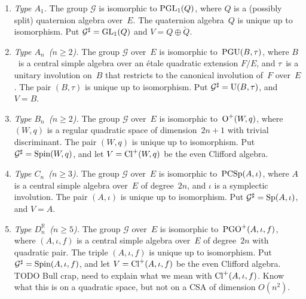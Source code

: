 \documentclass[10pt,twoside,leqno]{article}
\numberwithin{equation}{subsection}
\newcommand{\dual}[1]{\check{#1}}
\newcommand{\RR}{\mathbb{R}}
\newcommand{\GL}{\textnormal{GL}}
\newcommand{\PGL}{\textnormal{PGL}}
\newcommand{\UU}{\textnormal{U}}
\newcommand{\PGU}{\textnormal{PGU}}
\newcommand{\OO}{\textnormal{O}}
\newcommand{\PGO}{\textnormal{PGO}}
\newcommand{\Spin}{\textnormal{Spin}}
\newcommand{\Sp}{\textnormal{Sp}}
\newcommand{\PCSp}{\textnormal{PCSp}}
\newcommand{\Cliff}{\textnormal{Cl}}
\begin{document}
\begin{enumerate}[label=\thesubsection.\arabic*,align=left,%
  itemsep=\baselineskip,topsep=\baselineskip,%
  leftmargin=0pt,labelindent=0pt,labelsep=1ex,labelwidth=6ex,itemindent=!]
 \item \emph{Type \(A_{1}\).}
  The group \(\mathcal{G}\) is isomorphic to \(\PGL_{1}(Q)\),
  where \(Q\) is a (possibly split) quaternion algebra over~\(E\).
  The quaternion algebra~\(Q\) is unique up to isomorphism.
  Put \(\mathcal{G}^{\sharp} = \GL_{1}(Q)\) and \(V = Q \oplus \dual{Q}\).

 \item \emph{Type \(A_{n}\)~(\(n \ge 2\)).}
  The group \(\mathcal{G}\) over~\(E\) is isomorphic to~\(\PGU(B,\tau)\),
  where \(B\)~is a central simple algebra over
  an \'{e}tale quadratic extension \(F/E\),
  and \(\tau\)~is a unitary involution on~\(B\)
  that restricts to the canonical involution of~\(F\) over~\(E\).
  The pair \((B,\tau)\) is unique up to isomorphism.
  Put \(\mathcal{G}^{\sharp} = \UU(B,\tau)\), and \(V = B\).

 \item \emph{Type \(B_{n}\)~(\(n \ge 2\)).}
  The group \(\mathcal{G}\) over~\(E\) is isomorphic to~\(\OO^{+}(W,q)\),
  where \((W,q)\) is a regular quadratic space of dimension~\(2n+1\)
  with trivial discriminant.
  The pair \((W,q)\) is unique up to isomorphism.
  Put \(\mathcal{G}^{\sharp} = \Spin(W,q)\),
  and let \(V = \Cliff^{+}(W,q)\) be the even Clifford algebra.

 \item \emph{Type \(C_{n}\)~(\(n \ge 3\)).}
  The group \(\mathcal{G}\) over~\(E\) is isomorphic to~\(\PCSp(A,\iota)\),
  where \(A\) is a central simple algebra over~\(E\) of degree~\(2n\),
  and \(\iota\) is a symplectic involution.
  The pair \((A,\iota)\) is unique up to isomorphism.
  Put \(\mathcal{G}^{\sharp} = \Sp(A,\iota)\), and \(V = A\).

 \item \emph{Type \(D_{n}^{\RR}\)~(\(n \ge 5\)).}
  The group \(\mathcal{G}\) over~\(E\) is isomorphic to~\(\PGO^{+}(A,\iota,f)\),
  where \((A,\iota,f)\) is a central simple algebra over~\(E\)
  of degree~\(2n\) with quadratic pair.
  The triple \((A,\iota,f)\) is unique up to isomorphism.
  Put \(\mathcal{G}^{\sharp} = \Spin(A,\iota,f)\),
  and let \(V = \Cliff^{+}(A,\iota,f)\) be the even Clifford algebra.
  TODO %
  Bull crap, need to explain what we mean with \(\Cliff^{+}(A,\iota,f)\).
  Know what this is on a quadratic space,
  but not on a CSA of dimension \(O(n^2)\).


\end{enumerate}
\end{document}
